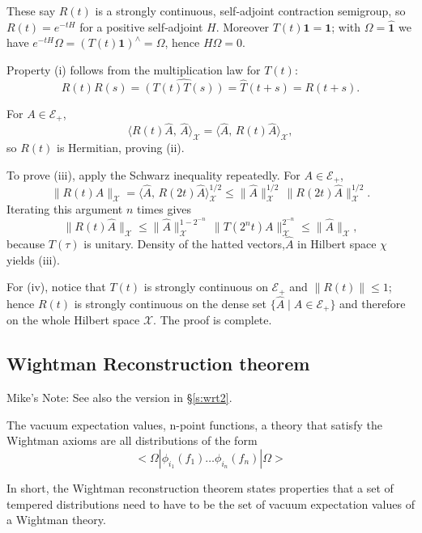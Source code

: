 \documentclass{article}
\newcommand\MRD[1]{{\color{red} Mike's Note: #1}}
\begin{document}
These say \(R(t)\) is a strongly continuous, self‑adjoint contraction
semigroup, so \(R(t)=e^{-tH}\) for a positive self‑adjoint \(H\).
Moreover \(T(t)\mathbf1=\mathbf1\); with \(\Omega=\widehat{\mathbf1}\) we have
\(e^{-tH}\Omega=(T(t)\mathbf1)^{\wedge}=\Omega\), hence \(H\Omega=0\).

Property (i) follows from the multiplication law for \(T(t)\):
\[
R(t)R(s)=\hat{(T(t)T(s))}=\hat{T}(t+s)=R(t+s).
\]

For \(A\in\mathcal{E}_{+}\),
\[
\langle R(t)\widehat{A},\,\widehat{A}\rangle_{\mathcal X}
  =\langle\widehat{A},\,R(t)\widehat{A}\rangle_{\mathcal X},
\]
so \(R(t)\) is Hermitian, proving (ii).

To prove (iii), apply the Schwarz inequality repeatedly.  For
\(A\in\mathcal{E}_{+}\),
\[
\|R(t)\widehat{A}\|_{\mathcal X}
  =\bigl\langle\widehat{A},\,R(2t)\widehat{A}\bigr\rangle_{\mathcal X}^{1/2}
  \le\|\widehat{A}\|_{\mathcal X}^{1/2}\,
      \|R(2t)\widehat{A}\|_{\mathcal X}^{1/2}.
\]
Iterating this argument \(n\) times gives
\[
\|R(t)\widehat{A}\|_{\mathcal X}
  \le\|\widehat{A}\|_{\mathcal X}^{1-2^{-n}}\,
      \|T(2^{n}t)A\|_{\mathcal X}^{2^{-n}}
  \le\|\widehat{A}\|_{\mathcal X},
\]
because \(T(\tau)\) is unitary.  Density of the hatted vectors,$\hat{A}$ in Hilbert space $\mathcal{\chi}$ yields (iii).

For (iv), notice that \(T(t)\) is strongly continuous on
\(\mathcal{E}_{+}\) and \(\lVert R(t)\rVert\le1\); hence \(R(t)\) is
strongly continuous on the dense set
\(\{\widehat{A}\mid A\in\mathcal{E}_{+}\}\) and therefore on the whole
Hilbert space \(\mathcal X\).  The proof is complete.






\subsection{Wightman Reconstruction theorem} \label{wightmantheorem}
\label{ss:wrt}

\MRD{See also the version in \S \ref{s:wrt2}.}

The vacuum expectation values, n-point functions, a theory that satisfy the Wightman axioms are all distributions of the form
\begin{equation}
    < \Omega | \phi_{i_1} (f_1) \ldots \phi_{i_n}(f_n) | \Omega> 
\end{equation}

In short, the Wightman reconstruction theorem states properties that a set of tempered distributions need to have to be the set of vacuum expectation values of a Wightman theory. 
\end{document}
